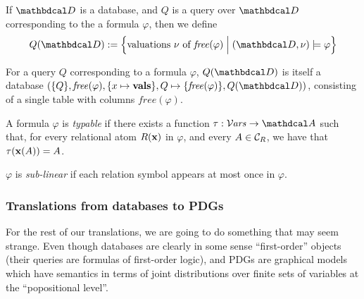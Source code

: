 \documentclass[the-pdg-manual.tex]{subfiles}
\begin{document}
\begin{defn}
	If $\D$ is a database, and $Q$ is a query over $\D$ corresponding to the a formula $\varphi$, then we define
	\[ Q(\D) := \Big\{ \text{valuations $\nu$ of $\mathit{free}(\varphi)$} \Bmid (\D,\nu) \models \varphi \Big\} \]
\end{defn}

\begin{remark}
	For a query $Q$ corresponding to a formula $\varphi$, $Q(\D)$ is itself a database $(\{Q\}, \mathit{free}(\varphi), \{x \mapsto \mathbf{vals}\}, Q\mapsto \{\mathit{free}(\varphi)\}, Q(\D))$, consisting of a single table with columns $\mathit{free}(\varphi)$.	
\end{remark}
% 


\begin{defn}
	A formula $\varphi$ is \emph{typable} if there exists a function $\tau: \Varis \to \Attrs$ such that, for every relational atom $R(\mathbf x)$ in $\varphi$, and every $A \in \mathcal C_R$, we have that $\tau(\mathbf x(A)) = A$.
\end{defn}
\begin{defn}
    $\varphi$ is \emph{sub-linear} if each relation symbol appears at most once in $\varphi$. 
\end{defn}


\subsubsection{Translations from databases to PDGs}



\begin{defn}
	
\end{defn}

For the rest of our translations, we are going to do something that may seem strange. Even though databases are clearly in some sense ``first-order'' objects (their queries are formulas of first-order logic), and PDGs are graphical models which have semantics in terms of joint distributions over finite sets of variables at the ``popositional level''.
\end{document}
